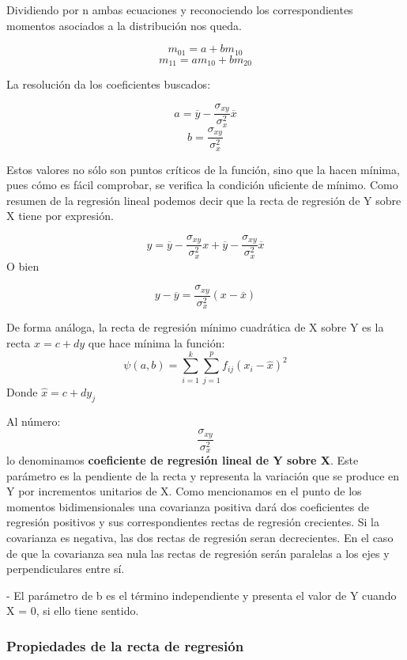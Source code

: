 \documentclass{article}
\begin{document}
	Dividiendo por n ambas ecuaciones y reconociendo los correspondientes momentos asociados a la distribución nos queda.
	
	$$
	m_{01} = a + bm_{10}$$
	$$
	m_{11} = am_{10} + bm_{20}
	$$	
	
	La resolución da los coeficientes buscados:
	
	$$
	a = \overline{y} - \frac{\sigma_{xy}}{\sigma_x^2} \overline{x}
$$	 
$$  b = \frac{\sigma_{xy}}{\sigma_x^2} $$
	 
	 Estos valores no sólo son puntos críticos de la función, sino que la hacen mínima, pues cómo es fácil comprobar, se verifica la condición uficiente de mínimo. Como resumen de la regresión lineal podemos decir que la recta de regresión de Y sobre X tiene por expresión.
	 
	$$ y = \overline{y} - \frac{\sigma_{xy}}{\sigma_x^2} x + \overline{y} - \frac{\sigma_{xy}}{\sigma_x^2} \overline{x}$$
	O bien
	
	$$ y - \overline{y} = \frac{\sigma_{xy}}{\sigma_x^2} (x - \overline{x}) $$
	
	De forma análoga, la recta de regresión mínimo cuadrática de X sobre Y es la recta $x = c +dy$ que hace mínima la función:
		$$\psi (a,b) = \sum_{i=1}^k \sum_{j=1}^p f_{ij} (x_i - \hat{x})^2 $$
	Donde $\hat{x} = c +dy_j $
	
	\vspace{2mm}
	
	Al número: $$\frac{\sigma_{xy}}{\sigma_x^2}$$ lo denominamos \textbf{coeficiente de regresión lineal de Y sobre X}. Este parámetro es la pendiente de la recta y representa la variación que se produce en Y por incrementos unitarios de X. Como mencionamos en el punto de los momentos bidimensionales una covarianza positiva dará dos coeficientes de regresión positivos y sus correspondientes rectas de regresión crecientes. Si la covarianza es negativa, las dos rectas de regresión seran decrecientes. En el caso de que la covarianza sea nula las rectas de regresión serán paralelas a los ejes y perpendiculares entre sí.
	
	- El parámetro de b es el término independiente y presenta el valor de Y cuando X = 0, si ello tiene sentido.
	
	\subsubsection{Propiedades de la recta de regresión}
	
\end{document}
